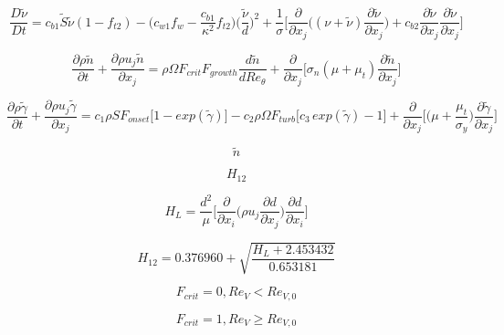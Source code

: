 

\begin{equation}
\frac{D\tilde{\nu}}{Dt} = c_{b1} \tilde{S}\tilde{\nu}(1-f_{t2}) -  \Big(c_{w1}f_{w} - \frac{c_{b1}}{\kappa ^2} f_{t2} \Big) \Big(\frac{\tilde{\nu}}{d}\Big)^2 + \frac{1}{\sigma}\bigg[\frac{\partial}{\partial x_j}\Big((\nu + \tilde{\nu})\frac{\partial\tilde{\nu}}{\partial x_j}\Big) + c_{b2}\frac{\partial\tilde{\nu}}{\partial x_j}\frac{\partial\tilde{\nu}}{\partial x_j}\bigg]
\end{equation}

\begin{equation}
\frac{\partial \rho\tilde{n}}{\partial t} + \frac{\partial \rho u_j \tilde{n}}{\partial x_j} = \rho \Omega F_{crit} F_{growth}\frac{d\tilde{n}}{dRe_{\theta}} + \frac{\partial}{\partial x_j}\Big[\sigma_n(\mu + \mu_t)\frac{\partial \tilde{n}}{\partial x_j}\Big]
\end{equation}

\begin{equation}
\frac{\partial \rho \tilde{\gamma}}{\partial t} + \frac{\partial \rho u_j \tilde{\gamma}}{\partial x_j} = c_1 \rho S F_{onset} \Big[1-{{exp}} (\tilde{\gamma})\Big] - c_2 \rho \Omega F_{turb} \Big[c_3 \, {{exp}} (\tilde{\gamma}) - 1 \Big] + \frac{\partial}{\partial x_j} \bigg[\Big(\mu + \frac{\mu_t}{\sigma_y}\Big) \frac{\partial \tilde{\gamma}}{\partial x_j}\bigg]
\end{equation}

\begin{equation}
\tilde{n}
\end{equation}

\begin{equation}
H_{12}
\end{equation}

\begin{equation}
H_L = \frac{d^2}{\mu} \bigg[ \frac{\partial}{\partial x_i} \Big( \rho u_j \frac{\partial d}{\partial x_j} \Big) \frac{\partial d}{\partial x_i} \bigg]
\end{equation}

\begin{equation}
H_{12} = 0.376960 + \sqrt{\frac{H_L + 2.453432}{0.653181}}
\end{equation}

\begin{equation}
F_{crit} = 0, Re_{V} < Re_{V,0}
\end{equation}

\begin{equation}
F_{crit} = 1, Re_{V} \ge Re_{V,0}
\end{equation}

